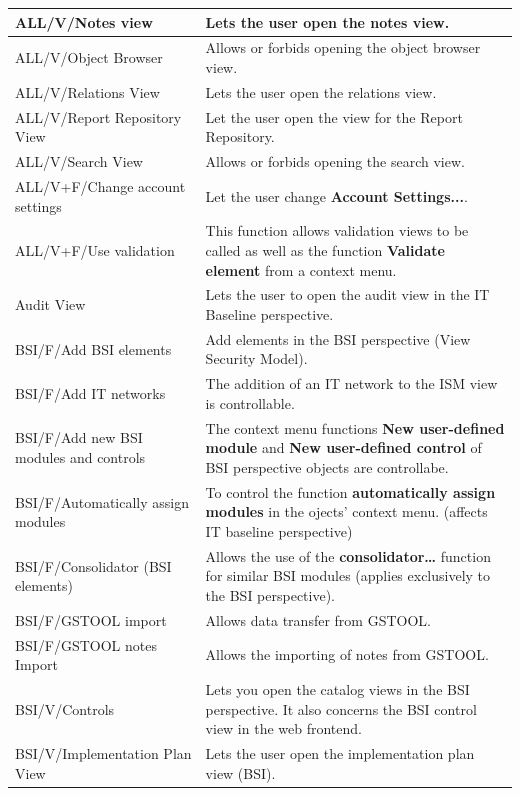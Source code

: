 \documentclass[a4paper,10pt]{book}
\begin{document}
\begin{longtable}{| p{5cm} | p{6cm} |}
ALL/V/Notes view & Lets the user open the notes view. \\[10pt] \hline
ALL/V/Object Browser & Allows or forbids opening the object browser view.
\\[10pt] \hline
ALL/V/Relations View & Lets the user open the relations view. \\[10pt] \hline
ALL/V/Report Repository View & Let the user open the view for the Report
Repository. \\[10pt] \hline
ALL/V/Search View &  Allows or forbids opening the search view. \\[10pt] \hline
ALL/V+F/Change account settings & Let the user change \textbf{Account
Settings...}. \\[10pt] \hline
ALL/V+F/Use validation & This function allows validation views to be called as
well as the function \textbf{Validate element} from a context menu. \\[10pt]
\hline
Audit View & Lets the user to open the audit view in the IT Baseline
perspective.  \\[10pt] \hline
BSI/F/Add BSI elements & Add elements in the BSI perspective (View Security
Model). \\[10pt] \hline
BSI/F/Add IT networks & The addition of an IT network to the ISM view is
controllable. \\[10pt] \hline
BSI/F/Add new BSI modules and controls & The context menu functions \textbf{New
user-defined module} and \textbf{New user-defined control} of BSI perspective
objects are controllabe. \\[10pt] \hline
BSI/F/Automatically assign modules & To control the function
\textbf{automatically assign modules} in the ojects' context menu. (affects IT
baseline perspective)  \\[10pt] \hline
BSI/F/Consolidator (BSI elements) & Allows the use of the
\textbf{consolidator…} function for similar BSI modules (applies exclusively to
the BSI perspective). \\[10pt] \hline
BSI/F/\textsc{GSTOOL} import & Allows data transfer from \textsc{GSTOOL}.
\\[10pt] \hline
BSI/F/\textsc{GSTOOL} notes  Import & Allows the importing of notes from
\textsc{GSTOOL}. \\[10pt] \hline
BSI/V/Controls & Lets you open the catalog views in the BSI perspective. It
also concerns the BSI control view in the web frontend. \\[10pt] \hline
BSI/V/Implementation Plan View & Lets the user open the implementation plan
view (BSI). \\[10pt] \hline

\end{longtable}
\end{document}
